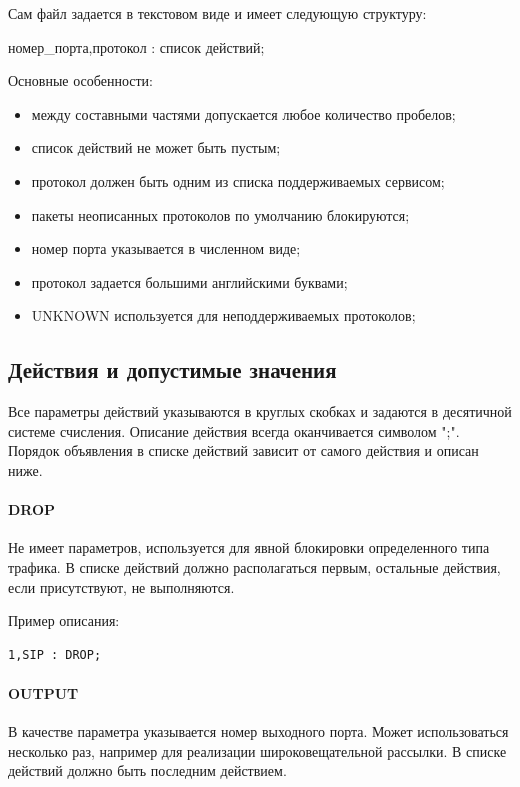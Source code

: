 Сам файл задается в текстовом виде и имеет следующую структуру:
\begin{center}
номер\_порта,протокол : список действий;
\end{center}

Основные особенности:
\begin{itemize}
\item между составными частями допускается любое количество пробелов;
\item список действий не может быть пустым;
\item протокол должен быть одним из списка поддерживаемых сервисом;
\item пакеты неописанных протоколов по умолчанию блокируются;
\item номер порта указывается в численном виде;
\item протокол задается большими английскими буквами;
\item UNKNOWN используется для неподдерживаемых протоколов;
\end{itemize}

\subsection{Действия и допустимые значения}
Все параметры действий указываются в круглых скобках и задаются в десятичной системе счисления. Описание действия всегда оканчивается символом ";". Порядок объявления в списке действий зависит от самого действия и описан ниже.

\paragraph{DROP}

Не имеет параметров, используется для явной блокировки определенного типа трафика. В списке действий должно располагаться первым, остальные действия, если присутствуют, не выполняются.

Пример описания:
\begin{lstlisting}
1,SIP : DROP;
\end{lstlisting}

\paragraph{OUTPUT}

В качестве параметра указывается номер выходного порта. Может использоваться несколько раз, например для реализации широковещательной рассылки. В списке действий должно быть последним действием.

